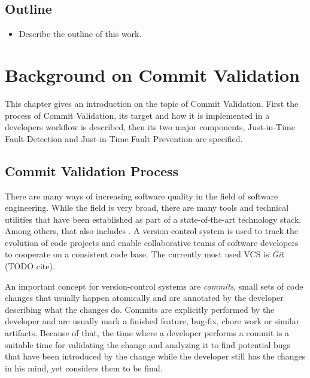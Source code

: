 \subsection{Outline}
\begin{itemize}
	\item Describe the outline of this work.
\end{itemize}


\section{Background on Commit Validation}

This chapter gives an introduction on the topic of Commit Validation. First the process of Commit Validation, its target and how it is implemented in a developers workflow is described, then its two major components, Just-in-Time Fault-Detection and Just-in-Time Fault Prevention are specified. 

\subsection{Commit Validation Process}
\label{sec:cvprocess}



There are many ways of increasing software quality in the field of software engineering. While the field is very broad, there are many tools and technical utilities that have been established as part of a state-of-the-art technology stack. Among others, that also includes . A version-control system is used to track the evolution of code projects and enable collaborative teams of software developers to cooperate on a consistent code base. The currently most used VCS is \textit{Git} (TODO cite). \cite{Chacon:2014:PG:2695634}

An important concept for version-control systems are \textit{commits}, small sets of code changes that usually happen atomically and are annotated by the developer describing what the changes do. Commits are explicitly performed by the developer and are usually mark a finished feature, bug-fix, chore work or similar artifacts. Because of that, the time where a developer performs a commit is a suitable time for validating the change and analyzing it to find potential bugs that have been introduced by the change while the developer still has the changes in his mind, yet considers them to be final. %

